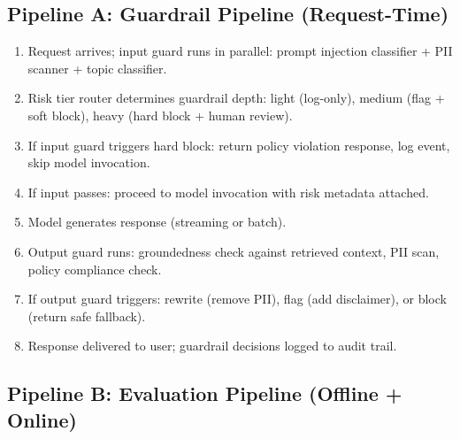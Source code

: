 \subsection*{Pipeline A: Guardrail Pipeline (Request-Time)}

\begin{enumerate}
  \item Request arrives; input guard runs in parallel: prompt injection classifier + PII scanner + topic classifier.
  \item Risk tier router determines guardrail depth: light (log-only), medium (flag + soft block), heavy (hard block + human review).
  \item If input guard triggers hard block: return policy violation response, log event, skip model invocation.
  \item If input passes: proceed to model invocation with risk metadata attached.
  \item Model generates response (streaming or batch).
  \item Output guard runs: groundedness check against retrieved context, PII scan, policy compliance check.
  \item If output guard triggers: rewrite (remove PII), flag (add disclaimer), or block (return safe fallback).
  \item Response delivered to user; guardrail decisions logged to audit trail.
\end{enumerate}

\subsection*{Pipeline B: Evaluation Pipeline (Offline + Online)}

